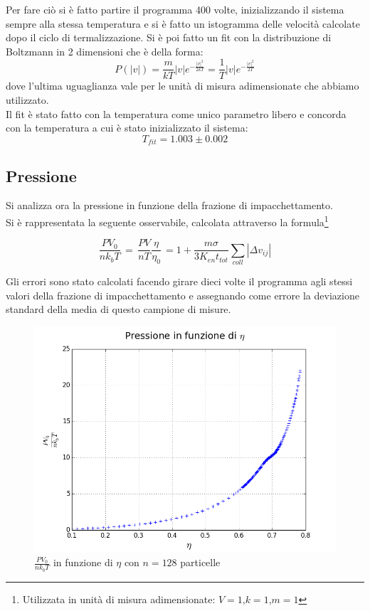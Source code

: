 Per fare ciò si è fatto partire il programma 400 volte, inizializzando il sistema sempre alla stessa temperatura e si è fatto un istogramma delle velocità calcolate dopo il ciclo di termalizzazione.
Si è poi fatto un fit con la distribuzione di Boltzmann in 2 dimensioni che è della forma:
$$
	P(|v|) = \frac{m}{k T} |v| e^{ - \frac{|v|^2}{2 k T}} = \frac{1}{T} |v| e^{ - \frac{|v|^2}{2T}}
$$
dove l'ultima uguaglianza vale per le unità di misura adimensionate che abbiamo utilizzato.\\
Il fit è stato fatto con la temperatura come unico parametro libero e concorda con la temperatura a cui è stato inizializzato il sistema:
$$
	T_{fit} = 1.003 \pm 0.002
$$


\subsection{Pressione}
Si analizza ora la pressione in funzione della frazione di impacchettamento.\\
Si è rappresentata la seguente osservabile, calcolata attraverso la formula\footnote{Utilizzata in unità di misura adimensionate: $V=1$,$k=1$,$m=1$}
\begin{center}
$$
	\frac{P V_0}{n k_{b} T} \, =\,  \frac{PV}{nT}\frac{\eta}{\eta_0} \, = 1 + \frac{m \sigma}{3 K_{en} t_{tot}} \sum_{coll} | \Delta v_{ij}| 
$$
\end{center}


Gli errori sono stato calcolati facendo girare dieci volte il programma agli stessi valori della frazione di impacchettamento e assegnando come errore la deviazione standard della media di questo campione di misure.

\begin{figure}[h!]
	\centering
	\includegraphics[scale=0.48]{sfere2D/pression.png}
	\caption{ $\frac{P V_0}{n k_{b} T}$ in funzione di $\eta$ con $n=128$ particelle}
	\end{figure}

